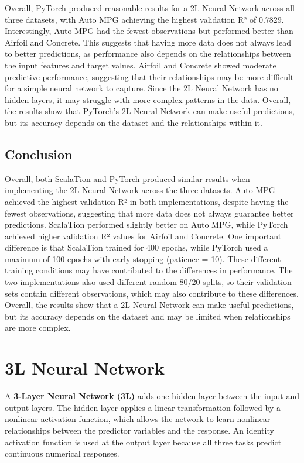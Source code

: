 \documentclass{article}
\begin{document}
Overall, PyTorch produced reasonable results for a  2L Neural Network across all three datasets, with Auto MPG achieving the highest validation R² of 0.7829. Interestingly, Auto MPG had the fewest observations but performed better than Airfoil and Concrete. This suggests that having more data does not always lead to better predictions, as performance also depends on the relationships between the input features and target values. Airfoil and Concrete showed moderate predictive performance, suggesting that their relationships may be more difficult for a simple neural network to capture. Since the 2L Neural Network has no hidden layers, it may struggle with more complex patterns in the data. Overall, the results show that PyTorch's 2L Neural Network can make useful predictions, but its accuracy depends on the dataset and the relationships within it.


\subsection{Conclusion}
Overall, both ScalaTion and PyTorch produced similar results when implementing the 2L Neural Network across the three datasets. Auto MPG achieved the highest validation R² in both implementations, despite having the fewest observations, suggesting that more data does not always guarantee better predictions. ScalaTion performed slightly better on Auto MPG, while PyTorch achieved higher validation R² values for Airfoil and Concrete. One important difference is that ScalaTion trained for 400 epochs, while PyTorch used a maximum of 100 epochs with early stopping (patience = 10). These different training conditions may have contributed to the differences in performance. The two implementations also used different random 80/20 splits, so their validation sets contain different observations, which may also contribute to these differences. Overall, the results show that a 2L Neural Network can make useful predictions, but its accuracy depends on the dataset and may be limited when relationships are more complex.

\section{3L Neural Network}
A \textbf{3-Layer Neural Network (3L)} adds one hidden layer between the input and output layers. The hidden layer applies a linear transformation followed by a nonlinear activation function, which allows the network to learn nonlinear relationships between the predictor variables and the response. An identity activation function is used at the output layer because all three tasks predict continuous numerical responses.
\medskip
\end{document}
